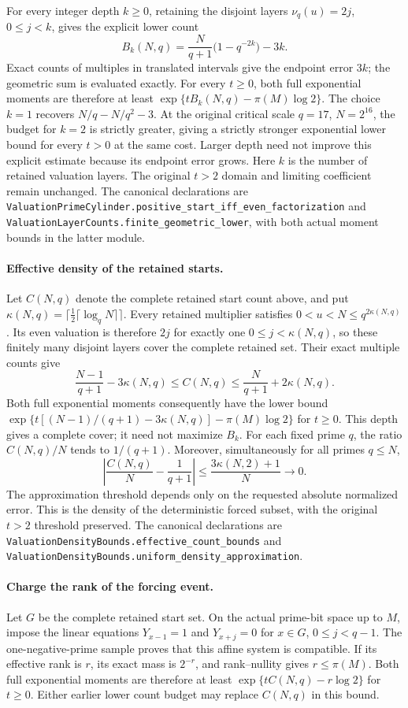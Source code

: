 For every integer depth $k\geq0$, retaining the disjoint layers
$\nu_q(u)=2j$, $0\leq j<k$, gives the explicit lower count
\[
 B_k(N,q)=\frac{N}{q+1}\bigl(1-q^{-2k}\bigr)-3k.
\]
Exact counts of multiples in translated intervals give the endpoint
error $3k$; the geometric sum is evaluated exactly.  For every $t\geq0$,
both full exponential moments are therefore at least
$\exp\{tB_k(N,q)-\pi(M)\log2\}$.
The choice $k=1$ recovers $N/q-N/q^2-3$.
At the original critical scale $q=17$, $N=2^{16}$, the budget for
$k=2$ is strictly greater, giving a strictly stronger exponential
lower bound for every $t>0$ at the same cost.
Larger depth need not improve this explicit estimate because its
endpoint error grows.  Here $k$ is the number of retained valuation layers.
The original $t>2$ domain and limiting coefficient remain unchanged.
The canonical declarations are
\texttt{ValuationPrimeCylinder.positive\_start\_iff\_even\_factorization}
and \texttt{ValuationLayerCounts.finite\_geometric\_lower}, with both
actual moment bounds in the latter module.

\paragraph{Effective density of the retained starts.}
Let $C(N,q)$ denote the complete retained start count above, and put
$\kappa(N,q)=\lceil\tfrac12\lceil\log_q N\rceil\rceil$.
Every retained multiplier satisfies $0<u<N\leq q^{2\kappa(N,q)}$.
Its even valuation is therefore $2j$ for exactly one
$0\leq j<\kappa(N,q)$, so these finitely many disjoint layers cover
the complete retained set.  Their exact multiple counts give
\[
 \frac{N-1}{q+1}-3\kappa(N,q)\leq C(N,q)
 \leq\frac{N}{q+1}+2\kappa(N,q).
\]
Both full exponential moments consequently have the lower bound
$\exp\{t[(N-1)/(q+1)-3\kappa(N,q)]-\pi(M)\log2\}$ for $t\geq0$.
This depth gives a complete cover; it need not maximize $B_k$.
For each fixed prime $q$, the ratio $C(N,q)/N$ tends to $1/(q+1)$.
Moreover, simultaneously for all primes $q\leq N$,
\[
 \left|\frac{C(N,q)}N-\frac1{q+1}\right|
 \leq\frac{3\kappa(N,2)+1}{N}\longrightarrow0.
\]
The approximation threshold depends only on the requested absolute
normalized error.  This is the density of the deterministic forced
subset, with the original $t>2$ threshold preserved.
The canonical declarations are
\texttt{ValuationDensityBounds.effective\_count\_bounds} and
\texttt{ValuationDensityBounds.uniform\_density\_approximation}.

\paragraph{Charge the rank of the forcing event.}
Let $G$ be the complete retained start set.  On the actual prime-bit
space up to $M$, impose the linear equations
$Y_{x-1}=1$ and $Y_{x+j}=0$ for $x\in G$, $0\leq j<q-1$.
The one-negative-prime sample proves that this affine system is
compatible.  If its effective rank is $r$, its exact mass is $2^{-r}$,
and rank--nullity gives $r\leq\pi(M)$.  Both full exponential moments
are therefore at least $\exp\{tC(N,q)-r\log2\}$ for $t\geq0$.
Either earlier lower count budget may replace $C(N,q)$ in this bound.

